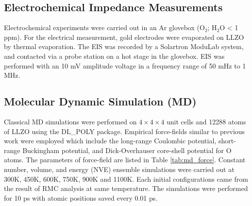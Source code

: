 \documentclass[twoside,twocolumn,9pt]{article}
\begin{document}
\subsection{Electrochemical Impedance Measurements}

Electrochemical experiments were carried out in an Ar glovebox (O$_2$; H$_2$O < 1 ppm). For the electrical measurement, 
gold electrodes were evaporated on LLZO by thermal evaporation. The EIS was recorded by a Solartron ModuLab system, 
and contacted via a probe station on a hot stage in the glovebox. EIS was performed with an 10 mV amplitude voltage 
in a frequency range of 50 mHz to 1 MHz.

\subsection{Molecular Dynamic Simulation (MD)}
Classical MD simulations were performed on $4\times 4\times 4$ unit cells and 12288 atoms of LLZO using the DL\_POLY package.
Empirical force-fields similar to previous work were employed which include the long-range Coulombic potential,
short-range Buckingham potential, and Dick-Overhauser core-shell potential for O atoms.
The parameters of force-field are listed in Table \ref{tab:md_force}.
Constant number, volume, and energy (NVE) ensemble simulations were carried out at 300K, 450K, 600K, 750K, 900K and 1100K.
Each initial configurations came from the result of RMC analysis at same temperature.
The simulations were performed for 10 ps with atomic positions saved every 0.01 ps.



\end{document}

